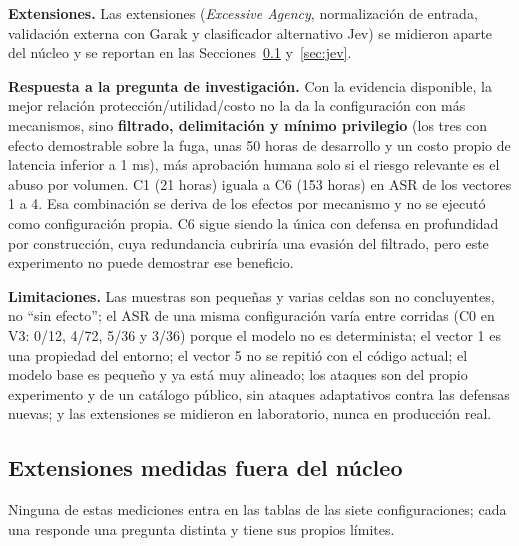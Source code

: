 \documentclass[11pt,letterpaper]{article}
\begin{document}
\textbf{Extensiones.} Las extensiones (\emph{Excessive Agency}, normalización de entrada, validación externa con Garak y clasificador alternativo Jev) se midieron aparte del núcleo y se reportan en las Secciones~\ref{sec:extmedidas} y~\ref{sec:jev}.

\textbf{Respuesta a la pregunta de investigación.} Con la evidencia disponible, la mejor relación protección/utilidad/costo no la da la configuración con más mecanismos, sino \textbf{filtrado, delimitación y mínimo privilegio} (los tres con efecto demostrable sobre la fuga, unas 50 horas de desarrollo y un costo propio de latencia inferior a 1 ms), más aprobación humana solo si el riesgo relevante es el abuso por volumen. C1 (21 horas) iguala a C6 (153 horas) en ASR de los vectores 1 a 4. Esa combinación se deriva de los efectos por mecanismo y no se ejecutó como configuración propia. C6 sigue siendo la única con defensa en profundidad por construcción, cuya redundancia cubriría una evasión del filtrado, pero este experimento no puede demostrar ese beneficio.

\textbf{Limitaciones.} Las muestras son pequeñas y varias celdas son no concluyentes, no ``sin efecto''; el ASR de una misma configuración varía entre corridas (C0 en V3: 0/12, 4/72, 5/36 y 3/36) porque el modelo no es determinista; el vector 1 es una propiedad del entorno; el vector 5 no se repitió con el código actual; el modelo base es pequeño y ya está muy alineado; los ataques son del propio experimento y de un catálogo público, sin ataques adaptativos contra las defensas nuevas; y las extensiones se midieron en laboratorio, nunca en producción real.

\subsection{Extensiones medidas fuera del núcleo}
\label{sec:extmedidas}

Ninguna de estas mediciones entra en las tablas de las siete configuraciones; cada una responde una pregunta distinta y tiene sus propios límites.
\end{document}
